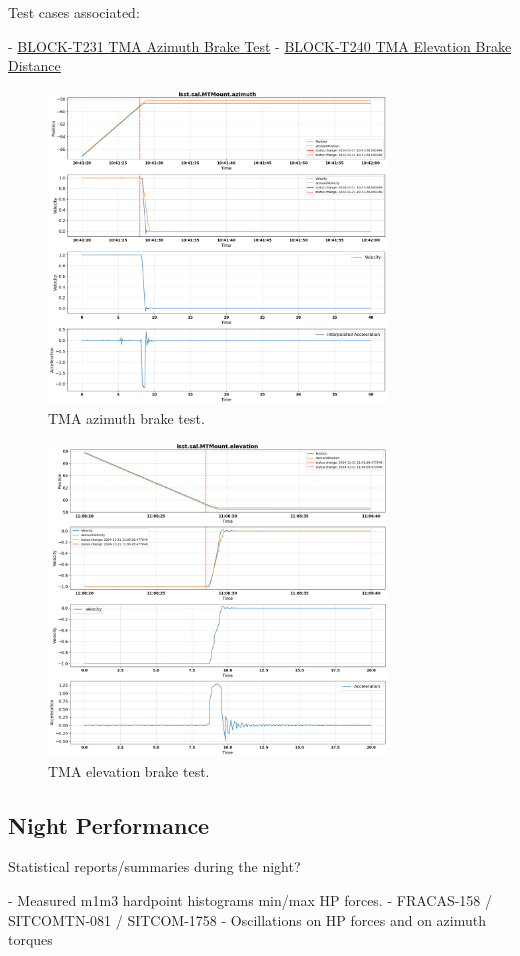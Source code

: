 Test cases associated:
\begin{itemize}
    - \href{https://rubinobs.atlassian.net/projects/BLOCK?selectedItem=com.atlassian.plugins.atlassian-connect-plugin:com.kanoah.test-manager__main-project-page#!/v2/testCase/BLOCK-T231}{BLOCK-T231 TMA Azimuth Brake Test}
    - \href{https://rubinobs.atlassian.net/projects/BLOCK?selectedItem=com.atlassian.plugins.atlassian-connect-plugin:com.kanoah.test-manager__main-project-page#!/v2/testCase/BLOCK-T240}{BLOCK-T240 TMA Elevation Brake Distance}
\end{itemize}

\begin{figure}
    \centering
    \includegraphics[width=0.8\textwidth]{spa/TMA_Az_brake_test_10.png}
    \caption{TMA azimuth brake test.}
    \label{fig:tma_azimuth_brake}
    \end{figure}

\begin{figure}
    \centering
    \includegraphics[width=0.8\textwidth]{spa/TMA_El_brake_test_10.png}
    \caption{TMA elevation brake test.}
    \label{fig:tma_elevation_brake}
    \end{figure}

\subsection{Night Performance}

Statistical reports/summaries during the night?
\begin{itemize}
    - Measured m1m3 hardpoint histograms min/max HP forces.
    - FRACAS-158 / SITCOMTN-081 / SITCOM-1758 - Oscillations on HP forces and on azimuth torques
\end{itemize}

